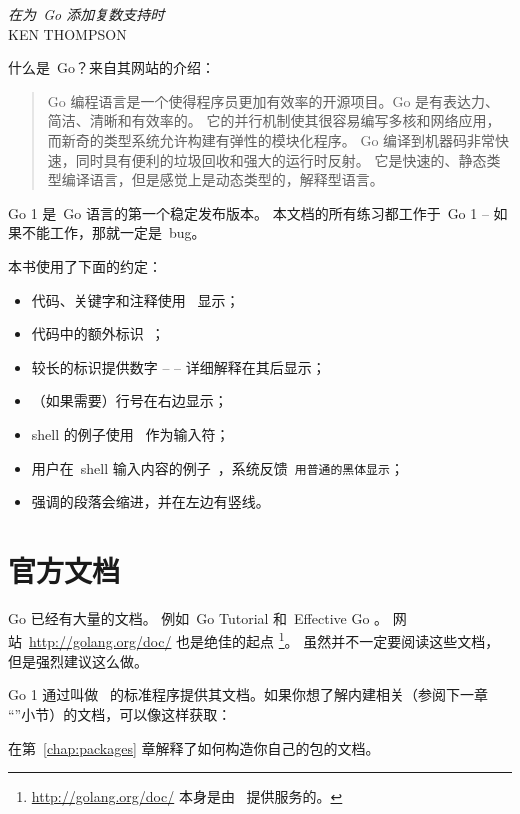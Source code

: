 {\textit{在为~Go 添加复数支持时}\\ \textsc{KEN THOMPSON}}

\noindent{}什么是~Go？来自其网站\cite{go_web}的介绍：
\begin{quote}
Go 编程语言是一个使得程序员更加有效率的开源项目。Go 是有表达力、简洁、清晰和有效率的。
它的并行机制使其很容易编写多核和网络应用，而新奇的类型系统允许构建有弹性的模块化程序。
Go 编译到机器码非常快速，同时具有便利的垃圾回收和强大的运行时反射。
它是快速的、静态类型编译语言，但是感觉上是动态类型的，解释型语言。
\end{quote}

Go 1 是~Go 语言的第一个稳定发布版本。
本文档的所有练习都工作于~Go 1 -- 如果不能工作，那就一定是~bug。

本书使用了下面的约定：
\begin{itemize}
\item 代码、关键字和注释使用~ 显示；
\item 代码中的额外标识~；
\item 较长的标识提供数字 --  -- 详细解释在其后显示；
\item （如果需要）行号在右边显示；
\item shell 的例子使用~\pr{} 作为输入符；
\item 用户在~shell 输入内容的例子~\texttt{}，系统反馈~\texttt{用普通的黑体显示}；
\item 强调的段落会缩进，并在左边有竖线。
\end{itemize}

\section{官方文档}
Go 已经有大量的文档。
例如~Go Tutorial \cite{go_tutorial} 和~Effective Go \cite{effective_go}。
网站~\url{http://golang.org/doc/} 也是绝佳的起点 
\footnote{\url{http://golang.org/doc/} 本身是由~ 提供服务的。}。
虽然并不一定要阅读这些文档，但是强烈建议这么做。

Go 1 通过叫做~
的标准程序提供其文档。如果你想了解内建相关（参阅下一章
``''小节）的文档，可以像这样获取：
\begin{display}
\pr {}
\end{display}

在第~\ref{chap:packages} 章解释了如何构造你自己的包的文档。

